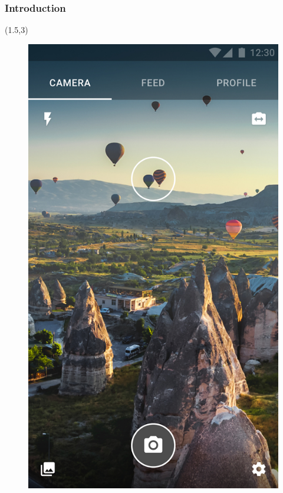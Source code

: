 \documentclass{beamer} %
\begin{document}
\begin{frame}
\frametitle{Introduction}
\begin{textblock}{1}(1.5,3)
	\begin{figure}
	\includegraphics[scale=0.2]{figures/prismaApp2}
	

\end{figure}
\end{textblock}
\end{frame}
\end{document}
